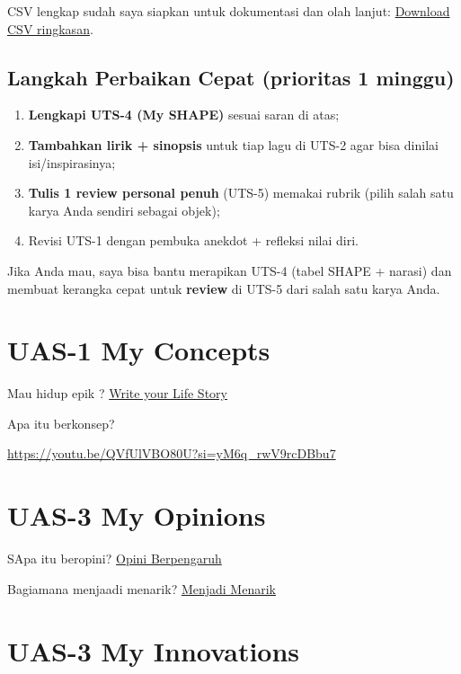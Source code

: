 \documentclass[
  letterpaper,
  DIV=11,
  numbers=noendperiod]{scrreprt}
\providecommand{\tightlist}{%
  \setlength{\itemsep}{0pt}\setlength{\parskip}{0pt}}
\begin{document}
CSV lengkap sudah saya siapkan untuk dokumentasi dan olah lanjut:
\href{sandbox:/mnt/data/UTS_self_assessment.csv}{Download CSV
ringkasan}.

\section{Langkah Perbaikan Cepat (prioritas 1
minggu)}\label{langkah-perbaikan-cepat-prioritas-1-minggu}

\begin{enumerate}
\def\labelenumi{\arabic{enumi}.}
\tightlist
\item
  \textbf{Lengkapi UTS-4 (My SHAPE)} sesuai saran di atas;
\item
  \textbf{Tambahkan lirik + sinopsis} untuk tiap lagu di UTS-2 agar bisa
  dinilai isi/inspirasinya;
\item
  \textbf{Tulis 1 review personal penuh} (UTS-5) memakai rubrik (pilih
  salah satu karya Anda sendiri sebagai objek);
\item
  Revisi UTS-1 dengan pembuka anekdot + refleksi nilai diri.
\end{enumerate}

Jika Anda mau, saya bisa bantu merapikan UTS-4 (tabel SHAPE + narasi)
dan membuat kerangka cepat untuk \textbf{review} di UTS-5 dari salah
satu karya Anda.


\chapter{UAS-1 My Concepts}\label{uas-1-my-concepts}

Mau hidup epik ? \href{lifestory.pdf}{Write your Life Story}

Apa itu berkonsep?

\url{https://youtu.be/QVfUlVBO80U?si=yM6q_rwV9rcDBbu7}


\chapter{UAS-3 My Opinions}\label{uas-3-my-opinions}

SApa itu beropini? \href{BM\%20Opini.mp4}{Opini Berpengaruh}

Bagiamana menjaadi menarik? \href{./Interesting.mp4}{Menjadi Menarik}


\chapter{UAS-3 My Innovations}\label{uas-3-my-innovations}
\end{document}
